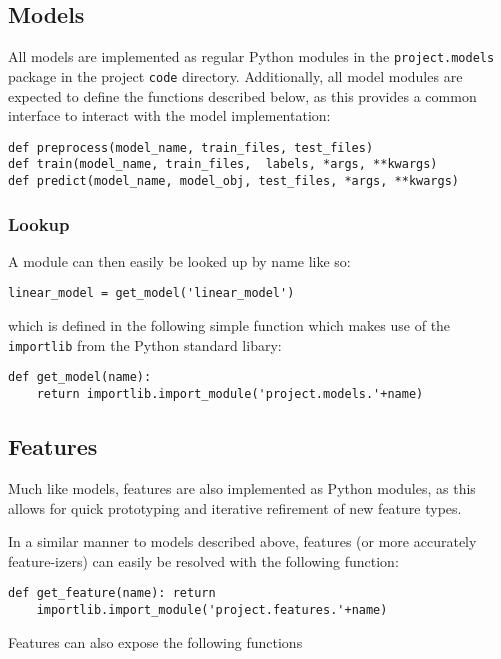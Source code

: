 \documentclass[
10pt, %
a4paper, %
oneside, %
headinclude,footinclude, %
BCOR5mm, %
]{scrartcl}
\begin{document}
\subsection{Models}

All models are implemented as regular Python modules in the
\texttt{project.models} package in the project \texttt{code} directory.
Additionally, all model modules are expected to define the functions described
below, as this provides a common interface to interact with the model
implementation: 
\begin{Verbatim}[frame=single]
def preprocess(model_name, train_files, test_files)
def train(model_name, train_files,  labels, *args, **kwargs)
def predict(model_name, model_obj, test_files, *args, **kwargs)
\end{Verbatim}

\subsubsection{Lookup}
\noindent A module can then easily be looked up by name like so:
\begin{Verbatim}[frame=single]
linear_model = get_model('linear_model')
\end{Verbatim}
\noindent which is defined in the following simple function which makes use
of the \texttt{importlib} from the Python standard libary:
\begin{Verbatim}[frame=single]
def get_model(name):
    return importlib.import_module('project.models.'+name)
\end{Verbatim}

\subsection{Features}

\noindent Much like models, features are also implemented as Python modules, as
this allows for quick prototyping and iterative refirement of new feature types.

\noindent In a similar manner to models described above, features (or more
accurately feature-izers) can easily be resolved with the following function:

\begin{Verbatim}[frame=single]
def get_feature(name): return
    importlib.import_module('project.features.'+name)
\end{Verbatim}

\noindent Features can also expose the following functions
\end{document}
